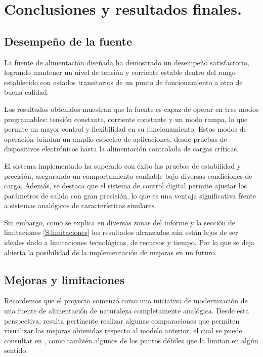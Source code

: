 \chapter{Conclusiones y resultados finales.}

\label{C:Conclusiones y resultados finales.}

\section{Desempeño de la fuente} 
La fuente de alimentación diseñada ha demostrado un desempeño satisfactorio, logrando mantener un nivel de tensión y corriente estable dentro del rango establecido con estados transitorios de un punto de funcionamiento a otro de buena calidad. \par
Los resultados obtenidos muestran que la fuente es capaz de operar en tres modos programables: tensión constante, corriente constante y un modo rampa, lo que permite un mayor control y flexibilidad en su funcionamiento. Estos modos de operación brindan un amplio espectro de aplicaciones, desde pruebas de dispositivos electrónicos hasta la alimentación controlada de cargas críticas. \par
El sistema implementado ha superado con éxito las pruebas de estabilidad y precisión, asegurando un comportamiento confiable bajo diversas condiciones de carga. Además, se destaca que el sistema de control digital permite ajustar los parámetros de salida con gran precisión, lo que es una ventaja significativa frente a sistemas analógicos de características similares.\par
Sin embargo, como se explica en diversas zonas del informe y la sección de limitaciones \ref{S:limitaciones} los resultados alcanzados aún están lejos de ser ideales dado a limitaciones tecnológicas, de recursos y tiempo. Por lo que se deja abierta la posibilidad de la implementación de mejoras en un futuro. \par

\section{Mejoras y limitaciones} 
Recordemos que el proyecto comenzó como una iniciativa de modernización de una fuente de alimentación de naturaleza completamente analógica. Desde esta perspectiva, resulta pertinente realizar algunas comparaciones que permiten visualizar las mejoras obtenidas respecto al modelo anterior, el cual se puede consultar en \cite{Fuente2023}, como también algunos de los puntos débiles que la limitan en algún sentido.\par

